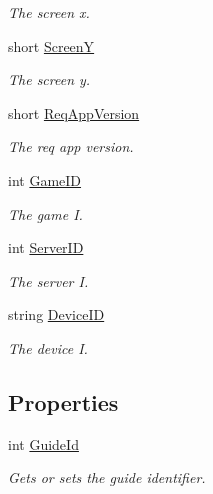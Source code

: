 \begin{DoxyCompactItemize}
\begin{DoxyCompactList}\small\item\em The screen x. \end{DoxyCompactList}\item 
short \mbox{\hyperlink{class_t_net_1_1_contract_1_1_action_1_1_register_action_a7bbd5b0b11b88437a3f05c885f0c2d0e}{ScreenY}}
\begin{DoxyCompactList}\small\item\em The screen y. \end{DoxyCompactList}\item 
short \mbox{\hyperlink{class_t_net_1_1_contract_1_1_action_1_1_register_action_ad5341c2cd9425a3828636a3e31f49cf4}{Req\+App\+Version}}
\begin{DoxyCompactList}\small\item\em The req app version. \end{DoxyCompactList}\item 
int \mbox{\hyperlink{class_t_net_1_1_contract_1_1_action_1_1_register_action_a49c01c3cf93983b4fa9f277dd3773e2c}{Game\+ID}}
\begin{DoxyCompactList}\small\item\em The game I. \end{DoxyCompactList}\item 
int \mbox{\hyperlink{class_t_net_1_1_contract_1_1_action_1_1_register_action_a5625850d148f5f6fd574ddbdf535a66f}{Server\+ID}}
\begin{DoxyCompactList}\small\item\em The server I. \end{DoxyCompactList}\item 
string \mbox{\hyperlink{class_t_net_1_1_contract_1_1_action_1_1_register_action_adc6cb1f26070d7010459a41944978fa8}{Device\+ID}}
\begin{DoxyCompactList}\small\item\em The device I. \end{DoxyCompactList}\end{DoxyCompactItemize}
\subsection*{Properties}
\begin{DoxyCompactItemize}
\item 
int \mbox{\hyperlink{class_t_net_1_1_contract_1_1_action_1_1_register_action_a92747074dc2b73c493d55e3d7d98b930}{Guide\+Id}}
\begin{DoxyCompactList}\small\item\em Gets or sets the guide identifier. \end{DoxyCompactList}\end{DoxyCompactItemize}
